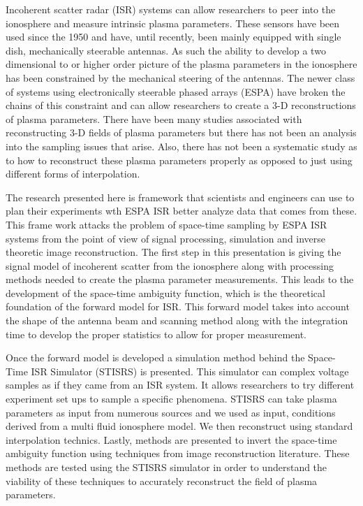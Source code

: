 
Incoherent scatter radar (ISR) systems can allow researchers to peer into the ionosphere and measure intrinsic plasma parameters. These sensors have been used since the 1950 and have, until recently, been mainly equipped with single dish, mechanically steerable antennas. As such the ability to develop a two dimensional to or higher order picture of the plasma parameters in the ionosphere has been constrained by the mechanical steering of the antennas. The newer class of systems using electronically steerable phased arrays (ESPA) have broken the chains of this constraint and can allow researchers to create a 3-D reconstructions of plasma parameters. There have been many studies associated with reconstructing 3-D fields of plasma parameters but there has not been an analysis into the sampling issues that arise. Also, there has not been a systematic study as to how to reconstruct these plasma parameters properly as opposed to just using different forms of interpolation.

The research presented here is framework that scientists and engineers can use to plan their experiments wth ESPA ISR better analyze data that comes from these. This frame work attacks the problem of space-time sampling by ESPA ISR systems from the point of view of signal processing, simulation and inverse theoretic image reconstruction. The first step in this presentation is giving the signal model of incoherent scatter from the ionosphere along with processing methods needed to create the plasma parameter measurements. This leads to the development of the space-time ambiguity function, which is the theoretical foundation of the forward model for ISR. This forward model takes into account the shape of the antenna beam and scanning method along with the integration time to develop the proper statistics to allow for proper measurement.

Once the forward model is developed a simulation method behind the Space-Time ISR Simulator (STISRS) is presented. This simulator can complex voltage samples as if they came from an ISR system. It allows researchers to try different experiment set ups to sample a  specific phenomena. STISRS can take plasma parameters as input from numerous sources and we used as input, conditions derived from a multi fluid ionosphere model. We then reconstruct using standard interpolation technics. Lastly, methods are presented to invert the space-time ambiguity function using techniques from image reconstruction literature. These methods are tested using the STISRS simulator in order to understand the viability of these techniques to accurately reconstruct the field of plasma parameters.
